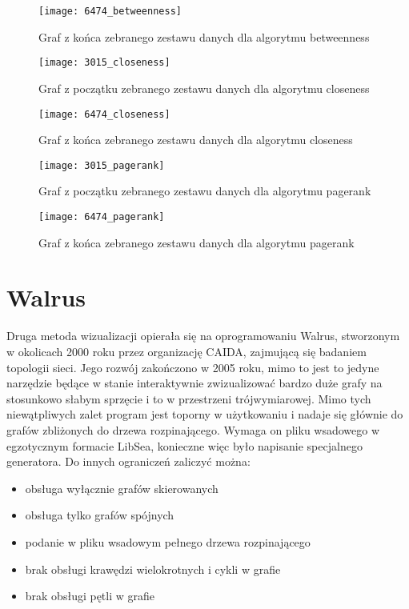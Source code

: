\FloatBarrier\FloatBarrier
\begin{figure}[h]
	\centering
	\texttt{[image: 6474\_betweenness]}
	\caption{Graf z końca zebranego zestawu danych dla algorytmu betweenness}
\end{figure}
\FloatBarrier\FloatBarrier

\FloatBarrier\FloatBarrier
\begin{figure}[h]
	\centering
	\texttt{[image: 3015\_closeness]}
	\caption{Graf z początku zebranego zestawu danych dla algorytmu closeness}
\end{figure}
\FloatBarrier\FloatBarrier

\FloatBarrier\FloatBarrier
\begin{figure}[h]
	\centering
	\texttt{[image: 6474\_closeness]}
	\caption{Graf z końca zebranego zestawu danych dla algorytmu closeness}
\end{figure}
\FloatBarrier\FloatBarrier

\FloatBarrier\FloatBarrier
\begin{figure}[h]
	\centering
	\texttt{[image: 3015\_pagerank]}
	\caption{Graf z początku zebranego zestawu danych dla algorytmu pagerank}
\end{figure}
\FloatBarrier\FloatBarrier

\FloatBarrier\FloatBarrier
\begin{figure}[h]
	\centering
	\texttt{[image: 6474\_pagerank]}
	\caption{Graf z końca zebranego zestawu danych dla algorytmu pagerank}
\end{figure}
\FloatBarrier\FloatBarrier

\section{Walrus}

Druga metoda wizualizacji opierała się na oprogramowaniu Walrus, stworzonym w okolicach 2000 roku przez organizację CAIDA, zajmującą się badaniem topologii sieci. Jego rozwój zakończono w 2005 roku, mimo to jest to jedyne narzędzie będące w stanie interaktywnie zwizualizować bardzo duże grafy na stosunkowo słabym sprzęcie i to w przestrzeni trójwymiarowej. Mimo tych niewątpliwych zalet program jest toporny w użytkowaniu i nadaje się głównie do grafów zbliżonych do drzewa rozpinającego. Wymaga on pliku wsadowego w egzotycznym formacie LibSea, konieczne więc było napisanie specjalnego generatora. Do innych ograniczeń zaliczyć można: 
\begin{itemize}
\item obsługa wyłącznie grafów skierowanych
\item obsługa tylko grafów spójnych
\item podanie w pliku wsadowym pełnego drzewa rozpinającego
\item brak obsługi krawędzi wielokrotnych i cykli w grafie
\item brak obsługi pętli w grafie
\end{itemize}


